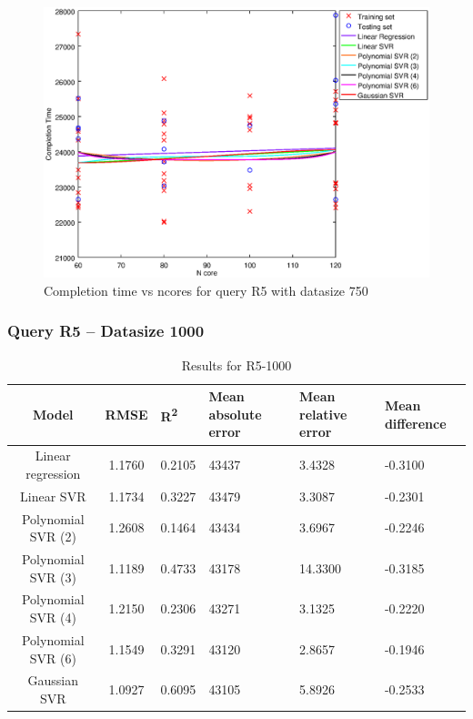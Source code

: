 \documentclass[a4paper,11pt]{article}
\begin{document}
\begin {figure}[hbtp]
\centering
\includegraphics[width=\textwidth]{output/R5_750_ONLY_1_LINEAR_NCORE/plot_R5_750.eps}
\caption{Completion time vs ncores for query R5 with datasize 750}
\label{fig:coreonly_linear_R5_750}
\end {figure}

\newpage
\subsubsection{Query R5 -- Datasize 1000}
\begin{table}[H]
	\centering
	\begin{adjustbox}{center}
		\begin{tabular}{c | c M{1.2cm} M{2.5cm} M{2.5cm} M{1.8cm}}
			Model & RMSE & R\textsuperscript{2} & Mean absolute error & Mean relative error & Mean difference \tabularnewline
			\hline
			Linear regression & 1.1760 & 0.2105 &  43437 & 3.4328 & -0.3100 \\
			Linear SVR & 1.1734 & 0.3227 &  43479 & 3.3087 & -0.2301 \\
			Polynomial SVR (2) & 1.2608 & 0.1464 &  43434 & 3.6967 & -0.2246 \\
			Polynomial SVR (3) & 1.1189 & 0.4733 &  43178 & 14.3300 & -0.3185 \\
			Polynomial SVR (4) & 1.2150 & 0.2306 &  43271 & 3.1325 & -0.2220 \\
			Polynomial SVR (6) & 1.1549 & 0.3291 &  43120 & 2.8657 & -0.1946 \\
			Gaussian SVR & 1.0927 & 0.6095 &  43105 & 5.8926 & -0.2533 \\
		\end{tabular}
	\end{adjustbox}
	\\
	\caption{Results for R5-1000}
	\label{fig:coreonly_linear_R5_1000}
\end{table}
\end{document}
